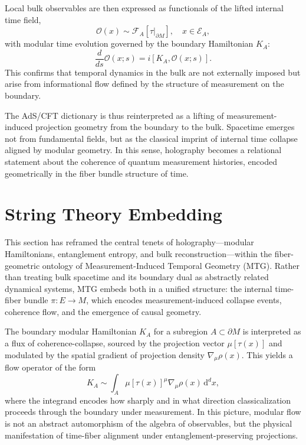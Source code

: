 \documentclass[11pt]{article}
\begin{document}
Local bulk observables are then expressed as functionals of the lifted internal time field,
\begin{equation}
\mathcal{O}(x) \sim \mathcal{F}_A[\tau|_{\partial M}], \quad x \in \mathcal{E}_A,
\end{equation}
with modular time evolution governed by the boundary Hamiltonian \( K_A \):
\begin{equation}
\frac{d}{ds} \mathcal{O}(x; s) = i [K_A, \mathcal{O}(x; s)].
\end{equation}
This confirms that temporal dynamics in the bulk are not externally imposed but arise from informational flow defined by the structure of measurement on the boundary.

The AdS/CFT dictionary is thus reinterpreted as a lifting of measurement-induced projection geometry from the boundary to the bulk. Spacetime emerges not from fundamental fields, but as the classical imprint of internal time collapse aligned by modular geometry. In this sense, holography becomes a relational statement about the coherence of quantum measurement histories, encoded geometrically in the fiber bundle structure of time.


\section{String Theory Embedding}\label{sec:9}
This section has reframed the central tenets of holography---modular Hamiltonians, entanglement entropy, and bulk reconstruction---within the fiber-geometric ontology of Measurement-Induced Temporal Geometry (MTG). Rather than treating bulk spacetime and its boundary dual as abstractly related dynamical systems, MTG embeds both in a unified structure: the internal time-fiber bundle \( \pi: E \to M \), which encodes measurement-induced collapse events, coherence flow, and the emergence of causal geometry.

The boundary modular Hamiltonian \( K_A \) for a subregion \( A \subset \partial M \) is interpreted as a flux of coherence-collapse, sourced by the projection vector \( \mu[\tau(x)] \) and modulated by the spatial gradient of projection density \( \nabla_\mu \rho(x) \). This yields a flow operator of the form
\[
K_A \sim \int_A \mu[\tau(x)]^\mu \nabla_\mu \rho(x) \, \mathrm{d}^d x,
\]
where the integrand encodes how sharply and in what direction classicalization proceeds through the boundary under measurement. In this picture, modular flow is not an abstract automorphism of the algebra of observables, but the physical manifestation of time-fiber alignment under entanglement-preserving projections.
\end{document}
